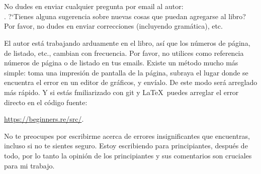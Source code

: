 \part*{\ESph{}}

\mysection{\ESph{}}

No dudes en enviar cualquier pregunta por email al autor: \\
\GTT{\EMAILS}.
?`Tienes alguna sugerencia sobre nuevas cosas que puedan agregarse al libro?
Por favor, no dudes en enviar correcciones (incluyendo gram\'atica), etc.

El autor est\'a trabajando arduamente en el libro, as\'i que los n\'umeros de p\'agina, de listado, etc., cambian con frecuencia.
Por favor, no utilices como referencia n\'umeros de p\'agina o de listado en tus emails.
Existe un m\'etodo mucho m\'as simple: toma una impresi\'on de pantalla de la p\'agina, subraya el lugar donde se encuentra el error en un editor de gr\'aficos,
y env\'ialo. De este modo ser\'a arreglado m\'as r\'apido.
Y si est\'as fmiliarizado con git y \LaTeX\, puedes arreglar el error directo en el c\'odigo fuente:

\url{https://beginners.re/src/}.

No te preocupes por escribirme acerca de errores insignificantes que encuentras, incluso si no te sientes seguro.
Estoy escribiendo para principiantes, despu\'es de todo, por lo tanto la opini\'on de los principiantes y sus comentarios son cruciales para mi trabajo.

